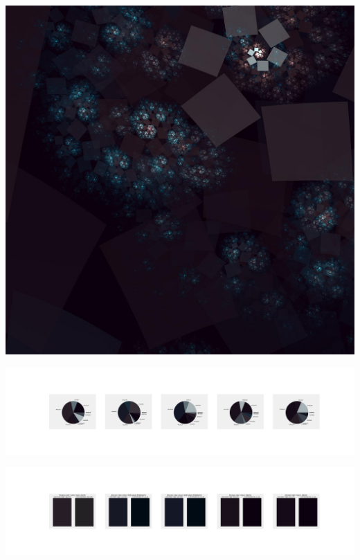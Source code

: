 \documentclass[11pt]{article}
\begin{document}
\begin{landscape}
    \begin{center}
    \includegraphics[width=\textwidth]{./nbimg/file (248).jpg}
    \end{center}

    \begin{center}
    \includegraphics[width=250mm]{./nbimg/pie-165.jpg}
    \end{center}

    \begin{center}
    \includegraphics[width=250mm]{./nbimg/peak-165.jpg}
    \end{center}
    


\end{landscape}
\end{document}
